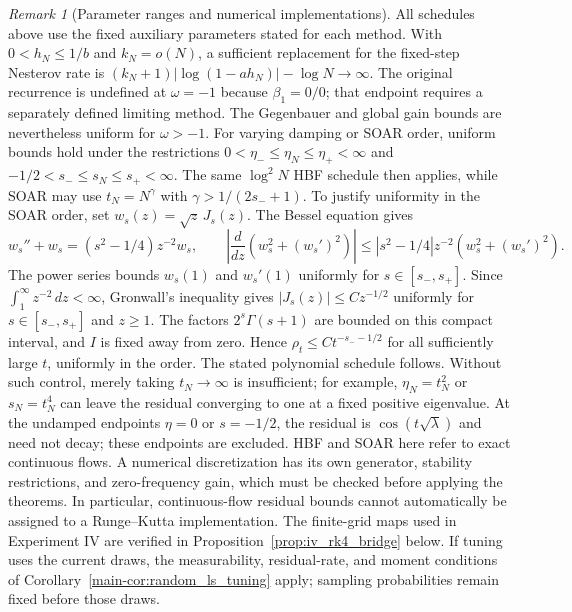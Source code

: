 \documentclass[11pt,a4paper,leqno]{article}
\numberwithin{equation}{section}
\numberwithin{figure}{section}
\numberwithin{table}{section}
\theoremstyle{plain}
\theoremstyle{definition}
\theoremstyle{remark}
\newtheorem{remark}[lemma]{Remark}
\begin{document}
\begin{remark}[Parameter ranges and numerical implementations]
All schedules above use the fixed auxiliary parameters stated for
each method.  With $0<h_N\leq1/b$ and $k_N=o(N)$, a sufficient
replacement for the fixed-step Nesterov rate is
$(k_N+1)|\log(1-ah_N)|-\log N\to\infty$.
The original recurrence is undefined at $\omega=-1$ because
$\beta_1=0/0$; that endpoint requires a separately defined limiting method.
The Gegenbauer and global gain bounds are nevertheless uniform for
$\omega>-1$.  For varying damping or SOAR order, uniform bounds hold under
the restrictions $0<\eta_-\leq\eta_N\leq\eta_+<\infty$ and
$-1/2<s_-\leq s_N\leq s_+<\infty$.
The same $\log^2N$ HBF schedule then applies, while SOAR may use
$t_N=N^\gamma$ with $\gamma>1/(2s_-+1)$.
To justify uniformity in the SOAR order, set $w_s(z)=\sqrt z\,J_s(z)$.
The Bessel equation \citep[Eq.~(10.2.1)]{nist2010handbook} gives
\[
 w_s''+w_s=(s^2-1/4)z^{-2}w_s,
 \qquad
 \left|\frac{d}{dz}(w_s^2+(w_s')^2)\right|
 \leq |s^2-1/4|z^{-2}(w_s^2+(w_s')^2).
\]
The power series bounds $w_s(1)$ and $w_s'(1)$ uniformly for
$s\in[s_-,s_+]$. Since $\int_1^\infty z^{-2}\,dz<\infty$,
Gronwall's inequality gives $|J_s(z)|\leq C z^{-1/2}$ uniformly for
$s\in[s_-,s_+]$ and $z\geq1$.
The factors $2^s\Gamma(s+1)$ are bounded on this compact interval,
and $I$ is fixed away from zero. Hence $\rho_t\leq C t^{-s_--1/2}$
for all sufficiently large $t$, uniformly in the order.
The stated polynomial schedule follows.
Without such control, merely taking $t_N\to\infty$ is insufficient;
for example, $\eta_N=t_N^2$ or $s_N=t_N^4$ can leave the residual
converging to one at a fixed positive eigenvalue.
At the undamped endpoints $\eta=0$ or $s=-1/2$, the residual is
$\cos(t\sqrt\lambda)$ and need not decay; these endpoints are excluded.
HBF and SOAR here refer to exact continuous flows.  A numerical
discretization has its own generator, stability restrictions, and
zero-frequency gain, which must be checked before applying the
theorems.  In particular, continuous-flow residual bounds cannot
automatically be assigned to a Runge--Kutta implementation.
The finite-grid maps used in Experiment IV are verified in
Proposition~\ref{prop:iv_rk4_bridge} below. If tuning uses the current draws,
the measurability, residual-rate, and moment conditions of
Corollary~\ref{main-cor:random_ls_tuning} apply; sampling probabilities remain
fixed before those draws.
\end{remark}
\end{document}
